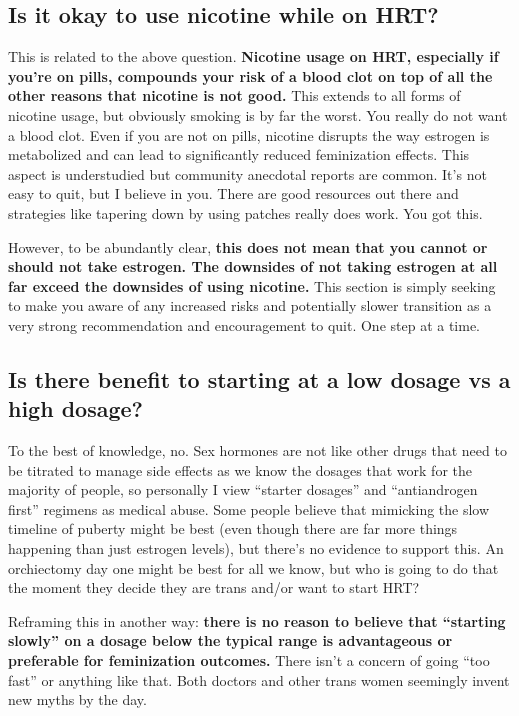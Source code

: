 \documentclass{article}
\begin{document}
\subsection{Is it okay to use nicotine while on HRT?}\label{11-2}

This is related to the above question. \textbf{Nicotine usage on HRT, especially if you’re on pills, compounds your risk of a blood clot on top of all the other reasons that nicotine is not good.} This extends to all forms of nicotine usage, but obviously smoking is by far the worst. You really do not want a blood clot. Even if you are not on pills, nicotine disrupts the way estrogen is metabolized and can lead to significantly reduced feminization effects. This aspect is understudied but community anecdotal reports are common. It’s not easy to quit, but I believe in you. There are good resources out there and strategies like tapering down by using patches really does work. You got this.

However, to be abundantly clear, \textbf{this does not mean that you cannot or should not take estrogen. The downsides of not taking estrogen at all far exceed the downsides of using nicotine.} This section is simply seeking to make you aware of any increased risks and potentially slower transition as a very strong recommendation and encouragement to quit. One step at a time.

\subsection{Is there benefit to starting at a low dosage vs a high dosage?}

To the best of knowledge, no. Sex hormones are not like other drugs that need to be titrated to manage side effects as we know the dosages that work for the majority of people, so personally I view “starter dosages” and “antiandrogen first” regimens as medical abuse. Some people believe that mimicking the slow timeline of puberty might be best (even though there are far more things happening than just estrogen levels), but there’s no evidence to support this. An orchiectomy day one might be best for all we know, but who is going to do that the moment they decide they are trans and/or want to start HRT?

Reframing this in another way: \textbf{there is no reason to believe that “starting slowly” on a dosage below the typical range is advantageous or preferable for feminization outcomes.} There isn't a concern of going “too fast” or anything like that. Both doctors and other trans women seemingly invent new myths by the day. 
\end{document}
